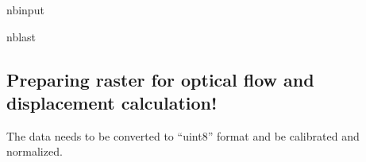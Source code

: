 \documentclass[letterpaper,10pt,english]{sphinxmanual}
\begin{document}
\begin{sphinxuseclass}{nbinput}
\begin{sphinxuseclass}{nblast}
{
\begin{sphinxVerbatim}[commandchars=\\\{\}]
\llap{\color{nbsphinxin}[ ]:\,\hspace{\fboxrule}\hspace{\fboxsep}}


                               


\end{sphinxVerbatim}
}

\end{sphinxuseclass}
\end{sphinxuseclass}

\subsection{Preparing raster for optical flow and displacement calculation!}
\label{\detokenize{notebooks/RockGlacier_optical:Preparing-raster-for-optical-flow-and-displacement-calculation!}}
\sphinxAtStartPar
The data needs to be converted to “uint8” format and be calibrated and normalized.
\end{document}
